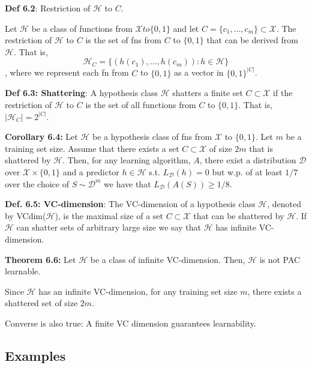 \textbf{Def 6.2}: Restriction of $\mathcal{H}$ to $C$. 

Let $\mathcal{H}$ be a class of functions from $\mathcal{X} to \{0, 1\}$ and let $C = \{c_1, \dots, c_m \} \subset \mathcal{X}$. The restriction of $\mathcal{H}$ to $C$ is the set of fns from $C$ to $\{0, 1\}$ that can be derived from $\mathcal{H}$. That is,
$$\mathcal{H}_C = \{(h(c_1), \dots, h(c_m)): h \in \mathcal{H}\}$$,
where we represent each fn from $C$ to $\{0, 1\}$ as a vector in $\{0, 1\}^{|C|}$.


\textbf{Def 6.3: Shattering}: A hypothesis class $\mathcal{H}$ shatters a finite set $C \subset \mathcal{X}$ if the restriction of $\mathcal{H}$ to $C$ is the set of all functions from $C$ to $\{0, 1\}$. That is, $|\mathcal{H}_C| = 2^{|C|}$.

\textbf{Corollary 6.4:} Let $\mathcal{H}$ be a hypothesis class of fns from $\mathcal{X}$ to $\{0, 1\}$. Let $m$ be a training set size. Assume that there exists a set $C \subset \mathcal{X}$ of size $2m$ that is shattered by $\mathcal{H}$. Then, for any learning algorithm, $A$, there exist a distribution $\mathcal{D}$ over $\mathcal{X} \times \{0, 1\}$ and a predictor $h \in \mathcal{H}$ s.t. $L_{\mathcal{D}}(h) = 0$ but w.p. of at least $1/7$ over the choice of $S \sim \mathcal{D}^m$ we have that $L_{\mathcal{D}}(A(S)) \geq 1/8$.

\textbf{Def. 6.5: VC-dimension}: The VC-dimension of a hypothesis class $\mathcal{H}$, denoted by VCdim($\mathcal{H}$), is the maximal size of a set $C \subset \mathcal{X}$ that can be shattered by $\mathcal{H}$. If $\mathcal{H}$ can shatter sets of arbitrary large size we say that $\mathcal{H}$ has infinite VC-dimension.

\textbf{Theorem 6.6:} Let $\mathcal{H}$ be a class of infinite VC-dimension. Then, $\mathcal{H}$ is not PAC learnable.

Since $\mathcal{H}$ has an infinite VC-dimension, for any training set size $m$, there exists a shattered set of size $2m$.

Converse is also true: A finite VC dimension guarantees learnability.

\subsection{Examples}

